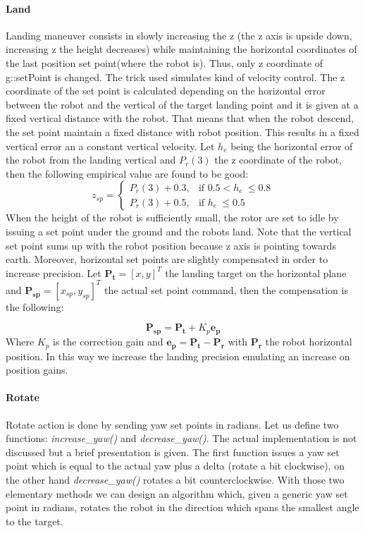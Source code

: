 \paragraph{Land} Landing maneuver consists in slowly increasing the z (the z axis is upside down, increasing z the height decreases) while maintaining the horizontal coordinates of the last position set point(where the robot is). Thus, only z coordinate of g::setPoint is changed. The trick used simulates  kind of velocity control. The z coordinate of the set point is calculated depending on the horizontal error between the robot and the vertical of the target landing point and it is given at a fixed vertical distance with the robot. That means that when the robot descend, the set point maintain a fixed distance with robot position. This results in a fixed vertical error an a constant vertical velocity. Let $h_e$ being the horizontal error of the robot from the landing vertical and $P_r(3)$ the z coordinate of the robot, then the following empirical value are found to be good:
\begin{equation}
z_{sp} = 
\begin{cases}
    P_r(3) + 0.3 , & \text{if } 0.5 <  h_e\ \leq 0.8 \\
    P_r(3) + 0.5  , & \text{if }  h_e\ \leq 0.5
\end{cases}
\label{eq:land}
\end{equation}
When the height of the robot is sufficiently small, the rotor are set to idle by issuing a set point under the ground and the robots land. Note that the vertical set point sums up with the robot position because z axis is pointing towards earth. Moreover, horizontal set points are slightly compensated in order to increase precision. Let $\boldsymbol{P_t} = [x ,y]^T$ the landing target on the horizontal plane and $\boldsymbol{P_{sp}} = [x_{sp} ,y_{sp}]^T$ the actual set point command, then the compensation is the following:

\begin{equation}
\boldsymbol{P_{sp}} = \boldsymbol{P_t} + K_p\boldsymbol{e_p}
\end{equation}
Where $K_p$ is the correction gain and $\boldsymbol{e_p} = \boldsymbol{P_t} - \boldsymbol{P_r}$ with $\boldsymbol{P_r}$ the robot horizontal position. In this way we increase the landing precision emulating an increase on position gains.

\paragraph{Rotate} Rotate action is done by sending yaw set points in radians. Let us define two functions: \textit{increase\_yaw()} and \textit{decrease\_yaw()}. The actual implementation is not discussed but a brief presentation is given. The first function issues a yaw set point which is equal to the actual yaw plus a delta (rotate a bit clockwise), on the other hand \textit{decrease\_yaw()} rotates a bit counterclockwise. With those two elementary methods we can design an algorithm which, given a generic yaw set point in radians, rotates the robot in the direction which spans the smallest angle to the target. 

